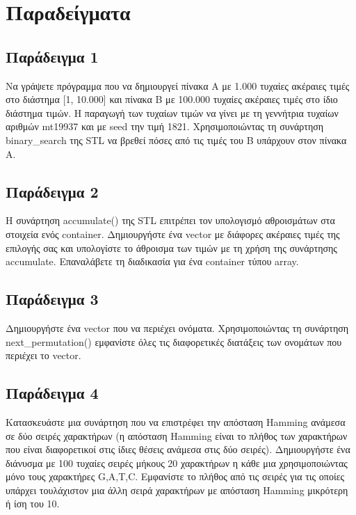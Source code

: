 

\section{Παραδείγματα}
\subsection{Παράδειγμα 1}
Να γράψετε πρόγραμμα που να δημιουργεί πίνακα Α με 1.000 τυχαίες ακέραιες τιμές στο διάστημα [1, 10.000] και πίνακα Β με 100.000 τυχαίες ακέραιες τιμές στο ίδιο διάστημα τιμών. Η παραγωγή των τυχαίων τιμών να γίνει με τη γεννήτρια τυχαίων αριθμών mt19937 και με seed την τιμή 1821. Χρησιμοποιώντας τη συνάρτηση binary\_search της STL να βρεθεί πόσες από τις τιμές του Β υπάρχουν στον πίνακα Α.






\subsection{Παράδειγμα 2}
Η συνάρτηση accumulate() της STL επιτρέπει τον υπολογισμό αθροισμάτων στα στοιχεία ενός container. Δημιουργήστε ένα vector με διάφορες ακέραιες τιμές της επιλογής σας και υπολογίστε το άθροισμα των τιμών με τη χρήση της συνάρτησης accumulate. Επαναλάβετε τη διαδικασία για ένα container τύπου array.





\subsection{Παράδειγμα 3}
Δημιουργήστε ένα vector που να περιέχει ονόματα. Χρησιμοποιώντας τη συνάρτηση next\_permutation() εμφανίστε όλες τις διαφορετικές διατάξεις των ονομάτων που περιέχει το vector.





\subsection{Παράδειγμα 4}
Κατασκευάστε μια συνάρτηση που να επιστρέφει την απόσταση Hamming ανάμεσα σε δύο σειρές χαρακτήρων (η απόσταση Hamming είναι το πλήθος των χαρακτήρων που είναι διαφορετικοί στις ίδιες θέσεις ανάμεσα στις δύο σειρές). Δημιουργήστε ένα διάνυσμα με 100 τυχαίες σειρές μήκους 20 χαρακτήρων η κάθε μια χρησιμοποιώντας μόνο τους χαρακτήρες G,A,T,C. Εμφανίστε το πλήθος από τις σειρές για τις οποίες υπάρχει τουλάχιστον μια άλλη σειρά χαρακτήρων με απόσταση Hamming μικρότερη ή ίση του 10.

